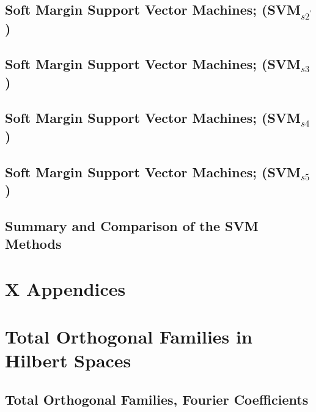 \documentclass[a4paper]{article}
\begin{document}
\subsection{ Soft Margin Support Vector Machines; (SVM$_{s2^\prime}$)} %

\subsection{ Soft Margin Support Vector Machines; (SVM$_{s3}$)} %

\subsection{ Soft Margin Support Vector Machines; (SVM$_{s4}$)} %

\subsection{ Soft Margin Support Vector Machines; (SVM$_{s5}$)} %

\subsection{ Summary and Comparison of the SVM Methods} %


\newpage
\section*{X Appendices}
\section{Total Orthogonal Families in Hilbert Spaces}
\subsection{ Total Orthogonal Families, Fourier Coefficients} %
\end{document}
